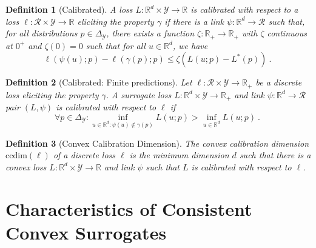 \documentclass{article}
\newcommand{\reals}{\mathbb{R}}
\newcommand{\simplex}{\Delta_\Y}
\newcommand{\ccdim}{\mathrm{ccdim}}
\newcommand{\R}{\mathcal{R}}
\newcommand{\Y}{\mathcal{Y}}
\newcommand{\risk}[1]{#1^*}
\newtheorem{definition}{Definition}
\begin{document}
\begin{definition}[Calibrated]\label{def:calibrated-general}
	A loss $L:\reals^d \times \Y \to \reals$ is \emph{calibrated} with respect to a loss $\ell : \R \times \Y \to \reals$ eliciting the property $\gamma$ if there is a link $\psi : \reals^d \to \R$ such that, for all distributions $p \in \simplex$, there exists a function $\zeta : \reals_+ \to \reals_+$ with $\zeta$ continuous at $0^+$ and $\zeta(0) = 0$ such that for all $u \in \reals^d$, we have
	\begin{equation}\label{eq:calibrated-general}
	\ell( \psi(u); p) - \ell(\gamma(p); p)  \leq \zeta \left(  L(u;p) - \risk{L}(p) \right)~.~
	\end{equation}
\end{definition}
\begin{definition}[Calibrated: Finite predictions]\label{def:calibrated-finite}
	Let $\ell : \R \times \Y \to \reals_+$ be a discrete loss eliciting the property $\gamma$.
	A surrogate loss $L : \reals^d \times \Y \to \reals_+$  and link $\psi:\reals^d \to \R$ pair $(L, \psi)$ is \emph{calibrated} with respect to $\ell$ if 
	\begin{equation}\label{eq:calibration}
	\forall p \in \simplex: \inf_{u \in \reals^d : \psi(u) \not \in \gamma(p)} L(u;p) > \inf_{u \in \reals^d} L(u;p)~.~
	\end{equation}
\end{definition}

\begin{definition}[Convex Calibration Dimension]
The \emph{convex calibration dimension} $\ccdim(\ell)$ of a discrete loss $\ell$ is the minimum dimension $d$ such that there is a convex loss $L: \reals^d \times \Y \to \reals$ and link $\psi$ such that $L$ is calibrated with respect to $\ell$.
\end{definition}


\section{Characteristics of Consistent Convex Surrogates}\label{sec:char-convex}
\end{document}
